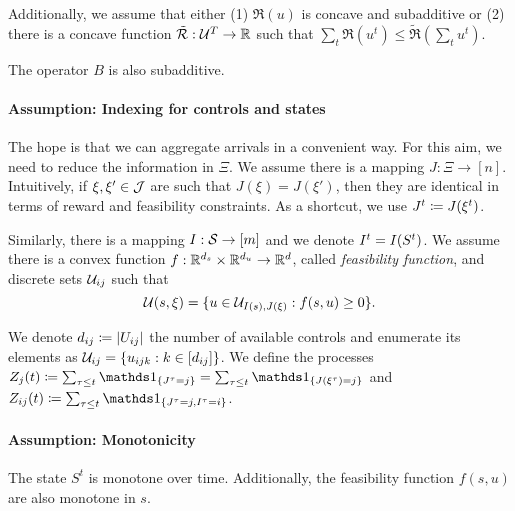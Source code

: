 \documentclass[letterpaper,11pt]{article}
\begin{document}
Additionally, we assume that either (1) $\Re(u)$ is concave and subadditive or (2) there is a concave function $\tilde \Re:\U^\T\to\R$ such that $\sum_t\Re(u^t)\leq \tilde \Re(\sum_t u^t)$.

The operator $B$ is also subadditive.


\paragraph{Assumption: Indexing for controls and states}
The hope is that we can aggregate arrivals in a convenient way.
For this aim, we need to reduce the information in $\Xi$.
We assume there is a mapping $J:\Xi\to[n]$.
Intuitively, if $\xi,\xi'\in\J$ are such that $J(\xi)=J(\xi')$, then they are identical in terms of reward and feasibility constraints.
As a shortcut, we use $\Jt\defeq J(\xit)$.

Similarly, there is a mapping $I:\S\to [m]$ and we denote $\It=I(S^t)$.
We assume there is a convex function $f:\R^\ds\times\R^\du\to\R^d$, called \emph{feasibility function}, and discrete sets $\U_{ij}$ such that
\[
\U(s,\xi) = \crl{u\in \U_{I(s),J(\xi)}: f(s,u)\geq 0}.
\]

We denote $d_{ij}\defeq \abs{U_{ij}}$ the number of available controls and enumerate its elements as $\U_{ij} = \crl{u_{ijk}: k\in [d_{ij}]}$. 
We define the processes $Z_j(t)\defeq\sum_{\tau\leq t}\In{J^\tau=j}=\sum_{\tau\leq t}\In{J(\xi^\tau)=j}$ and $Z_{ij}(t) \defeq \sum_{\tau\leq t}\In{J^\tau=j,I^\tau=i}$.


\paragraph{Assumption: Monotonicity}
The state $S^t$ is monotone over time.
Additionally, the feasibility function $f(s,u)$ are also monotone in $s$.
\end{document}
